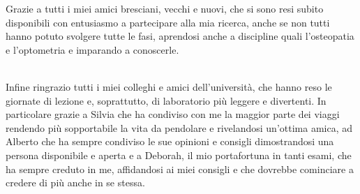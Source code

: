 Grazie a tutti i miei amici bresciani, vecchi e nuovi, che si sono resi subito disponibili con entusiasmo a partecipare alla mia ricerca, anche se non tutti hanno potuto svolgere tutte le fasi, aprendosi anche a discipline quali l’osteopatia e l’optometria e imparando a conoscerle.
\\\

Infine ringrazio tutti i miei colleghi e amici dell’università, che hanno reso le giornate di lezione e, soprattutto, di laboratorio più leggere e divertenti. In particolare grazie a Silvia che ha condiviso con me la maggior parte dei viaggi rendendo più sopportabile la vita da pendolare e rivelandosi un’ottima amica, ad Alberto che ha sempre condiviso le sue opinioni e consigli dimostrandosi una persona disponibile e aperta e a Deborah, il mio portafortuna in tanti esami, che ha sempre creduto in me, affidandosi ai miei consigli e che dovrebbe cominciare a credere di più anche in se stessa.